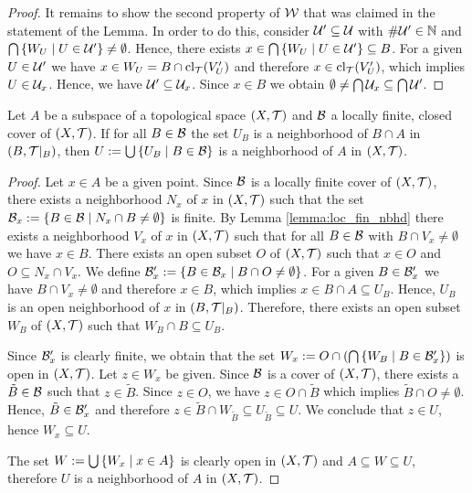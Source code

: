 \begin{proof}
	It remains to show the second property of $\cover[W]$ that was claimed in the statement of the Lemma. In order to do this, consider $\cover^\prime \subseteq \cover$ with $\card{\cover^\prime} \in \N$ and $\bigcap \Bbraces{W_U \mid U \in \cover^\prime} \neq \emptyset$. Hence, there exists $x \in \bigcap \Bbraces{W_U \mid U \in \cover^\prime} \subseteq B$. For a given $U \in \cover^\prime$ we have $x \in W_U = B \cap \cl{V^\prime_U}$ and therefore $x \in \cl{V^\prime_U}$, which implies $U \in \cover_x$. Hence, we have $\cover^\prime \subseteq \cover_x$. Since $x \in B$ we obtain $\emptyset \neq \bigcap \cover_x \subseteq \bigcap \cover^\prime$. 
\end{proof}

\begin{lemma}
	Let $A$ be a subspace of a topological space $\tspace$ and $\cover[B]$ a locally finite, closed cover of $\tspace$. If for all $B \in \cover[B]$ the set $U_B$ is a neighborhood of $B \cap A$ in $\reltspace[B]$, then $U := \bigcup \Bbraces{U_B \mid B \in \cover[B]}$ is a neighborhood of $A$ in $\tspace$. 
\end{lemma}
\begin{proof}
	Let $x \in A$ be a given point. Since $\cover[B]$ is a locally finite cover of $\tspace$, there exists a neighborhood $N_x$ of $x$ in $\tspace$ such that the set $\cover[B]_x := \Bbraces{B \in \cover[B] \mid N_x \cap B \neq \emptyset}$ is finite. By Lemma \ref{lemma:loc_fin_nbhd} there exists a neighborhood $V_x$ of  $x$ in $\tspace$ such that for all $B \in \cover[B]$ with $B \cap V_x \neq \emptyset$ we have $x \in B$. There exists an open subset $O$ of $\tspace$ such that $x \in O$ and $O \subseteq N_x \cap V_x$. We define $\cover[B]_x^\prime := \Bbraces{B \in \cover[B]_x \mid B \cap O \neq \emptyset}$. For a given $B \in \cover[B]_x^\prime$ we have $B \cap V_x \neq \emptyset$ and therefore $x \in B$, which implies $x \in B \cap A \subseteq U_B$. Hence, $U_B$ is an open neighborhood of $x$ in $\reltspace[B]$. Therefore, there exists an open subset $W_B$ of $\tspace$ such that $W_B \cap B \subseteq U_B$. 
	
	Since $\cover[B]_x^\prime$ is clearly finite, we obtain that the set $W_x := O \cap \pbraces{\bigcap \Bbraces{W_B \mid B \in \cover[B]^\prime_x}}$ is open in $\tspace$. Let $z \in W_x$ be given. Since $\cover[B]$ is a cover of $\tspace$, there exists a $\tilde{B} \in \cover[B]$ such that $z \in \tilde{B}$. Since $z \in O$, we have $z \in O \cap \tilde{B}$ which implies $\tilde{B} \cap O \neq \emptyset$. Hence, $\tilde{B} \in \cover[B]^\prime_x$ and therefore $z \in \tilde{B} \cap W_{\tilde{B}} \subseteq U_{\tilde{B}} \subseteq U$. We conclude that $z \in U$, hence $W_x \subseteq U$.
	
	The set $W := \bigcup \Bbraces{W_x \mid x \in A}$ is clearly open in $\tspace$ and $A \subseteq W \subseteq U$, therefore $U$ is a neighborhood of $A$ in $\tspace$. 
\end{proof}


